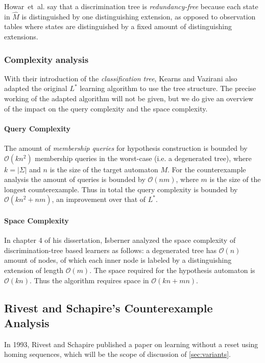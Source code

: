 \documentclass[multi,crop=false,class=article]{standalone}
\begin{document}
Howar~et~al. say that a discrimination tree is \textit{redundancy-free} because
each state in $\hat M$ is distinguished by one distinguishing extension, as
opposed to observation tables where states are distinguished by a fixed amount
of distinguishing extensions\cite{Howar14}.

\subsubsection{Complexity analysis}
\label{sec:complexity-analysis}
With their introduction of the \textit{classification tree}, Kearns and Vazirani
also adapted the original $L^*$ learning algorithm to use the tree
structure\cite{Kearns94}. The precise working of the adapted algorithm will not
be given, but we do give an overview of the impact on the query complexity and
the space complexity.

\paragraph{Query Complexity} The amount of \textit{membership queries} for
hypothesis construction is bounded by $\mathcal{O}(kn^2)$ membership queries in
the worst-case (i.e. a degenerated tree)\cite{Howar14,Kearns94,Isberner14b},
where $k = |\Sigma |$ and $n$ is the size of the target automaton $M$. For the
counterexample analysis the amount of queries is bounded by $\mathcal{O}(nm)$,
where $m$ is the size of the longest counterexample\cite{Kearns94}. Thus in
total the query complexity is bounded by $\mathcal{O}(kn^2 + nm)$, an
improvement over that of $L^*$.

\paragraph{Space Complexity} In chapter 4 of his dissertation, Isberner analyzed
the space complexity of discrimination-tree based learners as follows: a
degenerated tree has $\mathcal{O}(n)$ amount of nodes, of which each inner node
is labeled by a distinguishing extension of length
$\mathcal{O}(m)$\cite{Isberner15}.  The space required for the hypothesis
automaton is $\mathcal{O}(kn)$\cite{Isberner15}. Thus the algorithm requires
space in $\mathcal{O}(kn + mn)$\cite{Isberner14b,Isberner15}.

\subsection{Rivest and Schapire's Counterexample Analysis}
\label{sec:rivest-schap-count}
In 1993, Rivest and Schapire published a paper on learning without a reset using
homing sequences\cite{Rivest93}, which will be the scope of discussion of
\cref{sec:variants}.
\end{document}
